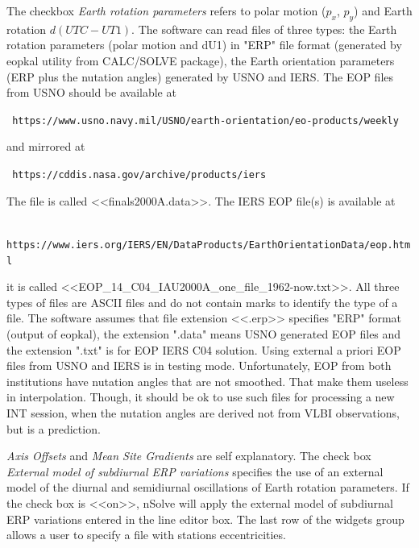 \documentclass [10pt,letterpaper]{report}
\newcommand{\nuSolve}{\greektext n\latintext Solve}
\begin{document}
The checkbox {\sl Earth rotation parameters} refers to polar motion
($p_x$, $p_y$) and Earth rotation $d(UTC-UT1)$. The software can read
files of three types: the Earth rotation parameters (polar motion and
dU1) in "ERP" file format (generated by eopkal utility from CALC/SOLVE
package), the Earth orientation parameters (ERP plus the nutation angles)
generated by USNO and IERS. The EOP files from USNO should be available
at
\begin{center}
{\tt
https://www.usno.navy.mil/USNO/earth-orientation/eo-products/weekly
}
\end{center}
\noindent
and mirrored at
\begin{center}
{\tt
https://cddis.nasa.gov/archive/products/iers
}
\end{center}
\noindent
The file is called <<finals2000A.data>>. The IERS EOP file(s) is available
at
\begin{center}
{\tt
https://www.iers.org/IERS/EN/DataProducts/EarthOrientationData/eop.html
}
\end{center}
\noindent
it is called <<EOP\_14\_C04\_IAU2000A\_one\_file\_1962-now.txt>>. All three
types of files are ASCII files and do not contain marks to identify
the type of a file. The software assumes that file extension <<.erp>>
specifies "ERP" format (output of eopkal), the extension ".data" means
USNO generated EOP files and the extension ".txt" is for EOP IERS C04
solution. Using external a priori EOP files from USNO and IERS is in
testing mode. Unfortunately, EOP from both institutions have nutation
angles that are not smoothed. That make them useless in interpolation.
Though, it should be ok to use such files for processing a new INT session,
when the nutation angles are derived not from VLBI observations, but is
a prediction.


{\sl Axis Offsets} and
{\sl Mean Site Gradients} are self explanatory. The check box {\sl
External model of subdiurnal ERP variations} specifies the use of an
external model of the diurnal and semidiurnal oscillations of Earth
rotation parameters. If the check box is <<on>>, \nuSolve{} will apply
the external model of subdiurnal ERP variations entered in the line
editor box.
The last row of the widgets group allows a user to specify a file with
stations eccentricities.
\end{document}
